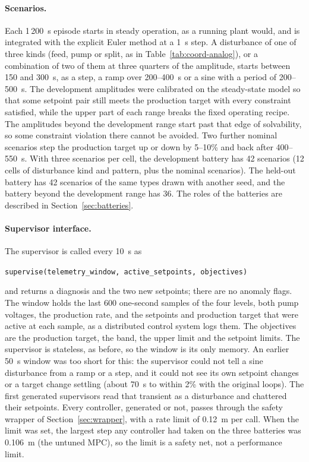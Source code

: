 \paragraph{Scenarios.} Each 1\,200~s episode starts in steady operation, as
a running plant would, and is integrated with the explicit Euler method at a
1~s step. A disturbance of one of three kinds (feed, pump or split, as in
Table~\ref{tab:coord-analog}), or a combination of two of them at three
quarters of the amplitude, starts between 150 and 300~s, as a step, a ramp
over 200--400~s or a sine with a period of 200--500~s. The development
amplitudes were calibrated on the steady-state model so that some setpoint
pair still meets the production target with every constraint satisfied,
while the upper part of each range breaks the fixed operating recipe. The
amplitudes beyond the development range start past that edge of
solvability, so some constraint violation there cannot be avoided. Two
further nominal scenarios step the production target up or down by 5--10\%
and back after 400--550~s. With three scenarios per cell, the development
battery has 42 scenarios (12 cells of disturbance kind and pattern, plus the
nominal scenarios). The held-out battery has 42 scenarios of the same types
drawn with another seed, and the battery beyond the development range has 36.
The roles of the batteries are described in Section~\ref{sec:batteries}.

\paragraph{Supervisor interface.} The supervisor is called every 10~s as
\begin{center}
\texttt{supervise(telemetry\_window, active\_setpoints, objectives)}
\end{center}
and returns a diagnosis and the two new setpoints; there are no anomaly
flags. The window holds the last 600 one-second samples of the four levels,
both pump voltages, the production rate, and the setpoints and production
target that were active at each sample, as a distributed control system logs
them. The objectives are the production target, the band, the upper limit and
the setpoint limits. The supervisor is stateless, as before, so the window is
its only memory. An earlier 50~s window was too short for this: the
supervisor could not tell a sine disturbance from a ramp or a step, and it
could not see its own setpoint changes or a target change settling (about
70~s to within 2\% with the original loops). The first generated supervisors
read that transient as a disturbance and chattered their setpoints. Every
controller, generated or not, passes through the safety wrapper of
Section~\ref{sec:wrapper}, with a rate limit of 0.12~m per call. When the limit was set, the largest
step any controller had taken on the three batteries was 0.106~m (the
untuned MPC), so the limit is a safety net, not a performance limit.


